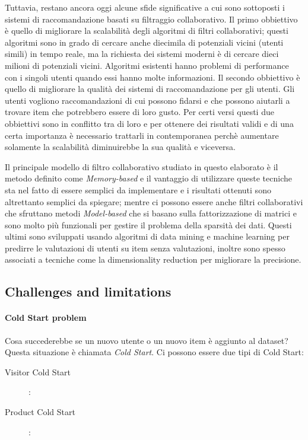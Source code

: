 Tuttavia, restano ancora oggi alcune sfide significative a cui sono sottoposti i sistemi di raccomandazione basati su 
filtraggio collaborativo.
Il primo obbiettivo è quello di migliorare la scalabilità degli algoritmi di filtri collaborativi; questi algoritmi sono in grado di cercare
anche diecimila di potenziali vicini (utenti simili) in tempo reale, ma la richiesta dei sistemi moderni è di cercare dieci milioni di 
potenziali vicini. Algoritmi esistenti hanno problemi di performance con i singoli utenti quando essi hanno molte informazioni.
Il secondo obbiettivo è quello di migliorare la qualità dei sistemi di raccomandazione per gli utenti. Gli utenti vogliono
raccomandazioni di cui possono fidarsi e che possono aiutarli a trovare item che potrebbero essere di loro gusto.
Per certi versi questi due obbiettivi sono in conflitto tra di loro e per ottenere dei risultati validi e di una certa importanza è 
necessario trattarli in contemporanea perchè aumentare solamente la scalabilità diminuirebbe la sua qualità e viceversa. 
\cite{item-based-collaborative-filtering} 

Il principale modello di filtro collaborativo studiato in questo elaborato è il metodo definito come \textit{Memory-based} e il 
vantaggio di utilizzare queste tecniche sta nel fatto di essere semplici da implementare e i risultati ottenuti sono altrettanto 
semplici da spiegare; mentre ci possono essere anche filtri collaborativi che sfruttano metodi \textit{Model-based} che si basano sulla 
fattorizzazione di matrici e sono molto più funzionali per gestire il problema della sparsità dei dati. Questi ultimi sono sviluppati
usando algoritmi di data mining e machine learning per predirre le valutazioni di utenti su item senza valutazioni, inoltre sono spesso 
associati a tecniche come la dimensionality reduction per migliorare la precisione.



\subsection{Challenges and limitations} \hfill \break


\paragraph{Cold Start problem}
Cosa succederebbe se un nuovo utente o un nuovo item è aggiunto al dataset? Questa situazione è chiamata \textit{Cold Start}. Ci possono
essere due tipi di Cold Start:
\begin{description}
	\item[Visitor Cold Start]:
	\item[Product Cold Start]: 
\end{description}


